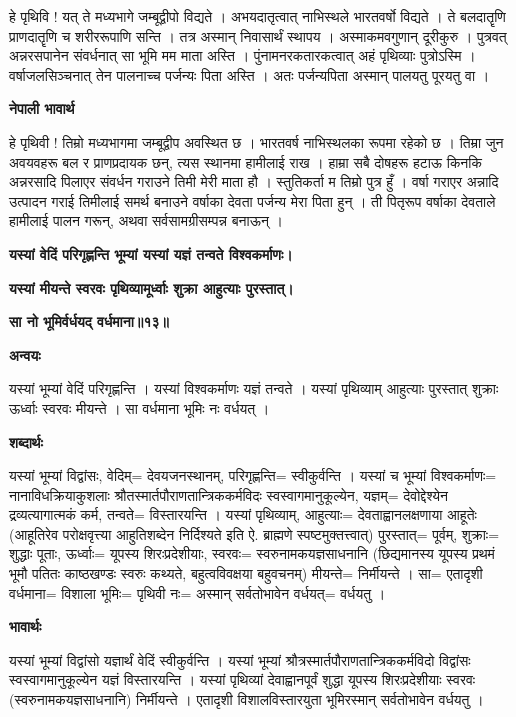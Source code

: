 \documentclass[11pt, a5paper]{article}
\begin{document}
हे पृथिवि ! यत् ते मध्यभागे जम्बूद्वीपो विद्यते । अभयदातृत्वात् नाभिस्थले भारतवर्षो विद्यते । ते बलदातॄणि प्राणदातॄणि च शरीररूपाणि सन्ति । तत्र अस्मान् निवासार्थं स्थापय । अस्माकमवगुणान् दूरीकुरु । पुत्रवत् अन्नरसपानेन संवर्धनात् सा भूमि मम माता अस्ति । पुंनामनरकतारकत्वात् अहं पृथिव्याः पुत्रोऽस्मि । वर्षाजलसिञ्चनात् तेन पालनाच्च पर्जन्यः पिता अस्ति । अतः पर्जन्यपिता अस्मान् पालयतु पूरयतु वा ।

\textbf{नेपाली भावार्थ}

हे पृथिवी ! तिम्रो मध्यभागमा जम्बूद्वीप अवस्थित छ । भारतवर्ष नाभिस्थलका रूपमा रहेको छ । तिम्रा जुन अवयवहरू बल र प्राणप्रदायक छन्, त्यस स्थानमा हामीलाई राख । हाम्रा सबै दोषहरू हटाऊ किनकि अन्नरसादि पिलाएर संवर्धन गराउने तिमी मेरी माता हौ । स्तुतिकर्ता म तिम्रो पुत्र हुँ । वर्षा गराएर अन्नादि उत्पादन गराई तिमीलाई समर्थ बनाउने वर्षाका देवता पर्जन्य मेरा पिता हुन् । ती पितृरूप वर्षाका देवताले हामीलाई पालन गरून्, अथवा सर्वसामग्रीसम्पन्न बनाऊन् ।

\textbf{यस्यां वेदिं परिगृह्णन्ति भूम्यां यस्यां यज्ञं तन्वते विश्वकर्माणः।}

\textbf{यस्यां मीयन्ते स्वरवः पृथिव्यामूर्ध्वाः शुक्रा आहुत्याः पुरस्तात्।}

\textbf{सा नो भूमिर्वर्धयद् वर्धमाना॥१३॥}

\textbf{अन्वयः}

यस्यां भूम्यां वेदिं परिगृह्णन्ति । यस्यां विश्वकर्माणः यज्ञं तन्वते । यस्यां पृथिव्याम् आहुत्याः पुरस्तात् शुक्राः ऊर्ध्वाः स्वरवः मीयन्ते । सा वर्धमाना भूमिः नः वर्धयत् ।

\textbf{शब्दार्थः}

यस्यां भूम्यां विद्वांसः, वेदिम्= देवयजनस्थानम्, परिगृह्णन्ति= स्वीकुर्वन्ति । यस्यां च भूम्यां विश्वकर्माणः= नानाविधक्रियाकुशलाः श्रौतस्मार्तपौराणतान्त्रिककर्मविदः स्वस्वागमानुकूल्येन, यज्ञम्= देवोद्देश्येन द्रव्यत्यागात्मकं कर्म, तन्वते= विस्तारयन्ति । यस्यां पृथिव्याम्, आहुत्याः= देवताह्वानलक्षणाया आहूतेः (आहूतिरेव परोक्षवृत्त्या आहुतिशब्देन निर्दिश्यते इति ऐ. ब्राह्मणे स्पष्टमुक्तत्त्वात्) पुरस्तात्= पूर्वम्, शुक्राः= शुद्धाः पूताः, ऊर्ध्वाः= यूपस्य शिरःप्रदेशीयाः, स्वरवः= स्वरुनामकयज्ञसाधनानि (छिद्यमानस्य यूपस्य प्रथमं भूमौ पतितः काष्ठखण्डः स्वरुः कथ्यते, बहुत्वविवक्षया बहुवचनम्) मीयन्ते= निर्मीयन्ते । सा= एतादृशी वर्धमाना= विशाला भूमिः= पृथिवी नः= अस्मान् सर्वतोभावेन वर्धयत्= वर्धयतु ।

\textbf{भावार्थः}

यस्यां भूम्यां विद्वांसो यज्ञार्थं वेदिं स्वीकुर्वन्ति । यस्यां भूम्यां श्रौत्रस्मार्तपौराणतान्त्रिककर्मविदो विद्वांसः स्वस्वागमानुकूल्येन यज्ञं विस्तारयन्ति । यस्यां पृथिव्यां देवाह्वानपूर्वं शुद्धा यूपस्य शिरःप्रदेशीयाः स्वरवः (स्वरुनामकयज्ञसाधनानि) निर्मीयन्ते । एतादृशी विशालविस्तारयुता भूमिरस्मान् सर्वतोभावेन वर्धयतु ।
\end{document}
